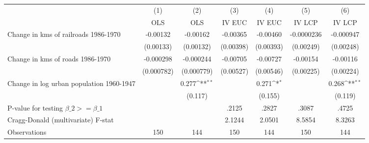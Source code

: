 {
\def\sym#1{\ifmmode^{#1}\else\(^{#1}\)\fi}
\begin{tabular}{l*{6}{c}}
\hline\hline
                &\multicolumn{1}{c}{(1)}&\multicolumn{1}{c}{(2)}&\multicolumn{1}{c}{(3)}&\multicolumn{1}{c}{(4)}&\multicolumn{1}{c}{(5)}&\multicolumn{1}{c}{(6)}\\
                &\multicolumn{1}{c}{OLS}&\multicolumn{1}{c}{OLS}&\multicolumn{1}{c}{IV EUC}&\multicolumn{1}{c}{IV EUC}&\multicolumn{1}{c}{IV LCP}&\multicolumn{1}{c}{IV LCP}\\
\hline
Change in kms of railroads 1986-1970& -0.00132         & -0.00162         & -0.00365         & -0.00460         &-0.0000236         &-0.000947         \\
                &(0.00133)         &(0.00132)         &(0.00398)         &(0.00393)         &(0.00249)         &(0.00248)         \\
[1em]
Change in kms of roads 1986-1970&-0.000298         &-0.000244         & -0.00705         & -0.00727         & -0.00154         & -0.00116         \\
                &(0.000782)         &(0.000779)         &(0.00527)         &(0.00546)         &(0.00225)         &(0.00224)         \\
[1em]
Change in log urban population 1960-1947&                  &    0.277\sym{**} &                  &    0.271\sym{*}  &                  &    0.268\sym{**} \\
                &                  &  (0.117)         &                  &  (0.155)         &                  &  (0.119)         \\
\hline
P-value for testing $\beta\_{2} >= \beta\_{1}$&                  &                  &    .2125         &    .2827         &    .3087         &    .4725         \\
Cragg-Donald (multivariate) F-stat&                  &                  &   2.1244         &   2.0501         &   8.5854         &   8.3263         \\
Observations    &      150         &      144         &      150         &      144         &      150         &      144         \\
\hline\hline
\end{tabular}
}
